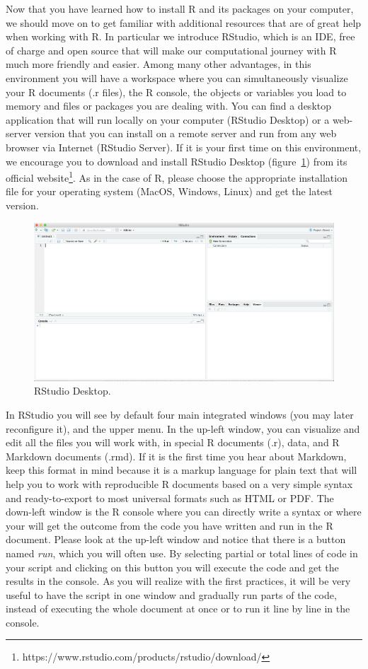 Now that you have learned how to install R and its packages on your computer, we should move on to get familiar with additional resources that are of great help when working with R. In particular we introduce RStudio, which is an IDE, free of charge and open source that will make our computational journey with R much more friendly and easier. Among many other advantages, in this environment you will have a workspace where you can simultaneously visualize your R documents (.r files), the R console, the objects or variables you load to memory and files or packages you are dealing with. You can find a desktop application that will run locally on your computer (RStudio Desktop) or a web-server version that you can install on a remote server and run from any web browser via Internet (RStudio Server). If it is your first time on this environment, we encourage you to download and install RStudio Desktop (figure~\ref{fig:r_studio}) from its official website\footnote{https://www.rstudio.com/products/rstudio/download/}. As in the case of R, please choose the appropriate installation file for your operating system (MacOS, Windows, Linux) and get the latest version.

\begin{figure}
\centering
\includegraphics[width=0.9\linewidth]{figures/ch3_r_studio}
\caption{RStudio Desktop.}
\label{fig:r_studio}
\end{figure}

In RStudio you will see by default four main integrated windows (you may later reconfigure it), and the upper menu. In the up-left window, you can visualize and edit all the files you will work with, in special R documents (.r), data, and R Markdown documents (.rmd).  If it is the first time you hear about Markdown, keep this format in mind because it is a markup language for plain text that will help you to work with reproducible R documents based on a very simple syntax and ready-to-export to most universal formats such as HTML or PDF. The down-left window is the R console where you can directly write a syntax or where your will get the outcome from the code you have written and run in the R document. Please look at the up-left window and notice that there is a button named \textit{run}, which you will often use. By selecting partial or total lines of code in your script and clicking on this button you will execute the code and get the results in the console.  As you will realize with the first practices, it will be very useful to have the script in one window and gradually run parts of the code, instead of executing the whole document at once or to run it line by line in the console.

